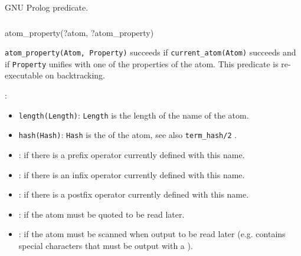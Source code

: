 \Portability

GNU Prolog predicate.

\subsubsection{\label{atom-property/2}}

\begin{TemplatesOneCol}
atom\_property(?atom, ?atom\_property)

\end{TemplatesOneCol}

\Description

\texttt{atom\_property(Atom, Property)} succeeds if
\texttt{current\_atom(Atom)} succeeds  and if
\texttt{Property} unifies with one of the properties of the atom. This
predicate is re-executable on backtracking.

:

\begin{itemize}

\item {}\texttt{length(Length)}: \texttt{Length} is the length of the
name of the atom.

\item {}\texttt{hash(Hash)}: \texttt{Hash} is the  of the
atom, see also \texttt{term\_hash/2} .

\item {}: if there is a prefix operator currently defined
with this name.

\item {}: if there is an infix operator currently defined
with this name.

\item {}: if there is a postfix operator currently defined
with this name.

\item {}: if the atom must be quoted to be read later.

\item {}: if the atom must be scanned when output to be
read later (e.g. contains special characters that must be output with a
\texttt{{\bs}} ).

\end{itemize}

\begin{PlErrors}




\end{PlErrors}

